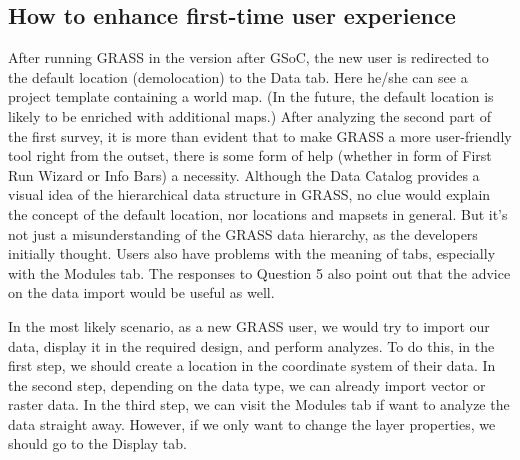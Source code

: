 \documentclass[a4paper,10pt,twoside]{article}
\begin{document}
\subsection{How to enhance first-time user experience}
\label{sec:proposal1}

After running GRASS in the version after GSoC, the new user is redirected to the default location (demolocation) to the Data tab. Here he/she can see a project template containing a world map. (In the future, the default location is likely to be enriched with additional maps.) After analyzing the second part of the first survey, it is more than evident that to make GRASS a more user-friendly tool right from the outset, there is some form of help (whether in form of First Run Wizard or Info Bars) a necessity. Although the Data Catalog provides a visual idea of the hierarchical data structure in GRASS, no clue would explain the concept of the default location, nor locations and mapsets in general. But it's not just a misunderstanding of the GRASS data hierarchy, as the developers initially thought. Users also have problems with the meaning of tabs, especially with the Modules tab. The responses to Question 5 also point out that the advice on the data import would be useful as well.

In the most likely scenario, as a new GRASS user, we would try to import our data, display it in the required design, and perform analyzes. To do this, in the first step, we should create a location in the coordinate system of their data. In the second step, depending on the data type, we can already import vector or raster data. In the third step, we can visit the Modules tab if want to analyze the data straight away. However, if we only want to change the layer properties, we should go to the Display tab.
\end{document}
